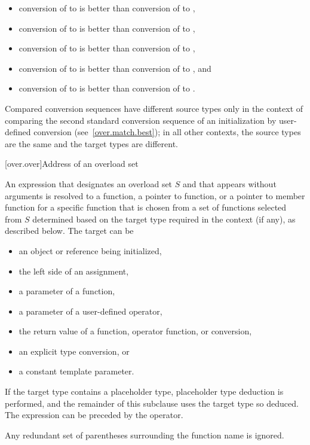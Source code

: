 \begin{itemize}
\begin{itemize}
\item
conversion of
to
is better than conversion of
to
,
\item
conversion of
to
is better than conversion of
to
,
\item
conversion of
to
is better than conversion of
to
,
\item
conversion of
to
is better than conversion
of
to
,
and
\item
conversion of
to
is better than conversion of
to
.
\end{itemize}

\begin{note}
Compared conversion sequences have different source types only in the
context of comparing the second standard conversion sequence of an
initialization by user-defined conversion (see~\ref{over.match.best}); in
all other contexts, the source types are the same and the target
types are different.
\end{note}
\end{itemize}%
%

[over.over]{Address of an overload set}%
%

\pnum
An expression
that designates an overload set $S$ and
that appears without arguments
is resolved to
a function,
a pointer to function, or
a pointer to member function
for a specific function
that is chosen from a set of functions selected from $S$
determined based on the target type required in the context (if any),
as described below.
The target can be
\begin{itemize}
\item
an object or reference being initialized,
\item
the left side of an assignment,
\item
a parameter of a function,
\item
a parameter of a user-defined operator,
\item
the return value of a function, operator function, or conversion,
\item
an explicit type conversion, or
\item
a constant template parameter.
\end{itemize}
If the target type contains a placeholder type,
placeholder type deduction is performed, and
the remainder of this subclause uses the target type so deduced.
The expression can be preceded by the \tcode{\&} operator.
\begin{note}
Any redundant set of parentheses surrounding the function name is
ignored.
\end{note}

